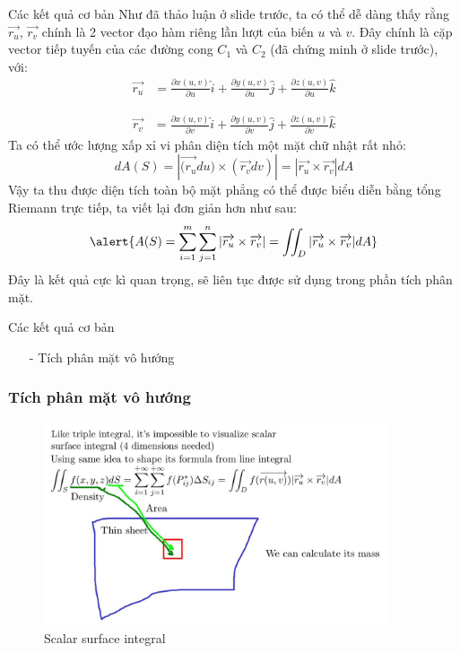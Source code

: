 \documentclass[8pt]{beamer}
\begin{document}
\begin{frame}{Các kết quả cơ bản}
	Như đã thảo luận ở slide trước, ta có thể dễ dàng thấy rằng $\overrightarrow{r_{u}}$, $\overrightarrow{r_{v}}$ chính là 2 vector đạo hàm riêng lần lượt của biến $u$ và $v$. Đây chính là cặp vector tiếp tuyến của các đường cong $C_{1}$ và $C_{2}$ (đã chứng minh ở slide trước), với:
\begin{equation*}
\begin{split}
	\overrightarrow{r_{u}}&=\frac{\partial x(u,v)}{\partial u}\hat i+\frac{\partial y(u,v)}{\partial u}\hat j+\frac{\partial z(u,v)}{\partial u}\hat k
\end{split}
\end{equation*}

\begin{equation*}
\begin{split}
	\overrightarrow{r_{v}}&=\frac{\partial x(u,v)}{\partial v}\hat i+\frac{\partial y(u,v)}{\partial v}\hat j+\frac{\partial z(u,v)}{\partial v}\hat k
\end{split}
\end{equation*}
Ta có thể ước lượng xấp xỉ vi phân diện tích một mặt chữ nhật rất nhỏ:
$$dA(S)=|\overrightarrow{(r_{u}}du)\times(\overrightarrow{r_{v}}dv)|=|\overrightarrow{r_{u}}\times\overrightarrow{r_{v}}|dA$$
Vậy ta thu được diện tích toàn bộ mặt phẳng có thể được biểu diễn bằng tổng Riemann trực tiếp, ta viết lại đơn giản hơn như sau:
$$\alert{A(S)=\sum_{i=1}^{m}\sum_{j=1}^{n}|\overrightarrow{r_{u}}\times\overrightarrow{r_{v}}|=\iint_{D}|\overrightarrow{r_{u}}\times\overrightarrow{r_{v}}|dA}$$
Đây là kết quả cực kì quan trọng, sẽ liên tục được sử dụng trong phần tích phân mặt.
\end{frame}
\begin{frame}{Các kết quả cơ bản}
\begin{itemize}
	\item[-] Tích phân mặt vô hướng
\end{itemize}
\subsubsection{Tích phân mặt vô hướng}
\begin{figure}[h]
			\includegraphics[width=0.9\textwidth]{sheet.jpg}
			\caption{Scalar surface integral}			\label{fig:re5}
\end{figure}

\end{frame}
\end{document}
